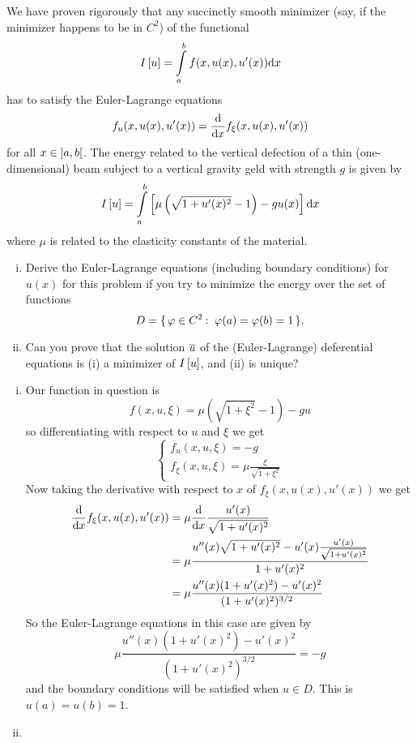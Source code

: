 \documentclass[12pt]{memoir}
\begin{document}
\begin{Ej}
    We have proven rigorously that any succinctly smooth minimizer (say, if the minimizer happens to be in $C^2$) of the functional
    $$I\left\lbrack u\right\rbrack=\int\limits_a^b f(x,u(x),u'(x))\dd x $$
    has to satisfy the Euler-Lagrange equations
    $$f_u(x,u(x),u'(x))=\dv{x}f_\xi(x,u(x),u'(x))$$
    for all $x\in\left\rbrack a,b\right\lbrack$. The energy related to the vertical defection of a thin (one-dimensional) beam subject to a vertical gravity geld with strength $g$ is given by
    $$I\left\lbrack u\right\rbrack=\int\limits_a^b \left\lbrack\mu\left(\sqrt{1+u'(x)^2}-1\right)-gu(x)\right\rbrack\dd x $$
    where $\mu$ is related to the elasticity constants of the material.
    \begin{enumerate}[i)]
        \item Derive the Euler-Lagrange equations (including boundary conditions) for $u(x)$ for this problem if you
        try to minimize the energy over the set of functions
        $$D=\set{\vf\in C^2\:\ \vf(a)=\vf(b)=1}.$$
        \item Can you prove that the solution $\overline u$ of the (Euler-Lagrange) deferential equations is (i) a minimizer of
        $I\left\lbrack u\right\rbrack$, and (ii) is unique?
    \end{enumerate}
\end{Ej}

\begin{ptcbr}
    \begin{enumerate}[i)]
        \item Our function in question is 
        $$f(x,u,\xi)=\mu\left(\sqrt{1+\xi^2}-1\right)-gu$$
        so differentiating with respect to $u$ and $\xi$ we get 
        $$
        \begin{cases}
            f_u(x,u,\xi)=-g\\
            f_\xi(x,u,\xi)=\mu\frac{\xi}{\sqrt{1+\xi^2}}
        \end{cases}
        $$
        Now taking the derivative with respect to $x$ of $f_{\xi}(x,u(x),u'(x))$ we get 
        \begin{align*}
            \dv{x}f_{\xi}(x,u(x),u'(x))&=\mu\dv{x}\frac{u'(x)}{\sqrt{1+u'(x)^2}}\\
            &=\mu\frac{u''(x)\sqrt{1+u'(x)^2}-u'(x)\frac{u'(x)}{\sqrt{1+u'(x)^2}}}{1+u'(x)^2}\\
            &=\mu\frac{u''(x)(1+u'(x)^2)-u'(x)^2}{(1+u'(x)^2)^{3/2}}
        \end{align*}
    So the Euler-Lagrange equations in this case are given by
    $$\mu\frac{u''(x)(1+u'(x)^2)-u'(x)^2}{(1+u'(x)^2)^{3/2}}=-g$$
    and the boundary conditions will be satisfied when $u\in D$. This is $u(a)=u(b)=1$. 
    \item {}
    \end{enumerate}
\end{ptcbr}
\end{document}
